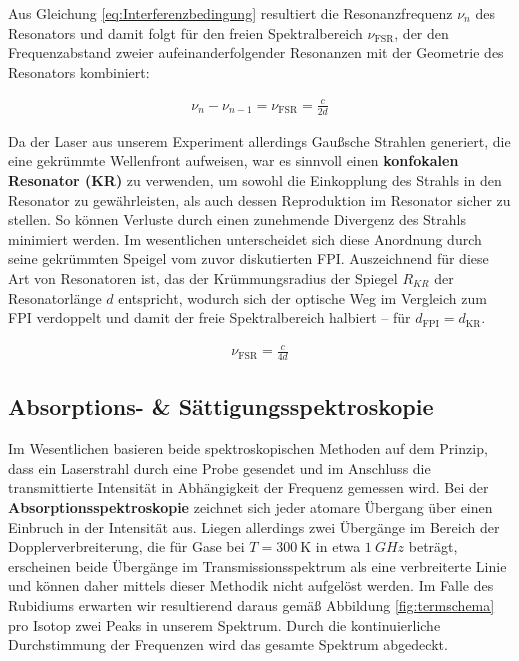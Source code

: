 \noindent Aus Gleichung \ref{eq:Interferenzbedingung} resultiert die Resonanzfrequenz $\nu_{n}$ des Resonators und damit folgt für den freien Spektralbereich $\nu_{\text{FSR}}$, der den Frequenzabstand zweier aufeinanderfolgender Resonanzen mit der Geometrie des Resonators kombiniert: 

\begin{align}
    \nu_{n}-\nu_{n-1}=\nu_{\text{FSR}}=\frac{c}{2d}
\end{align}


\noindent Da der Laser aus unserem Experiment allerdings Gaußsche Strahlen generiert, die eine gekrümmte Wellenfront aufweisen, war es sinnvoll einen \textbf{konfokalen Resonator (KR)} zu verwenden, um sowohl die Einkopplung des Strahls in den Resonator zu gewährleisten, als auch dessen Reproduktion im Resonator sicher zu stellen. So können Verluste durch einen zunehmende Divergenz des Strahls minimiert werden. Im wesentlichen unterscheidet sich diese Anordnung durch seine gekrümmten Speigel vom zuvor diskutierten FPI. Auszeichnend für diese Art von Resonatoren ist, das der Krümmungsradius der Spiegel $R_{KR}$ der Resonatorlänge $d$ entspricht, wodurch sich der optische Weg im Vergleich zum FPI verdoppelt und damit der freie Spektralbereich halbiert -- für $d_{\text{FPI}}=d_{\text{KR}}$.

\begin{align}
    \nu_{\text{FSR}}=\frac{c}{4d} \label{eq:freier Spektral Bereich}
\end{align}

\subsection{Absorptions- \& Sättigungsspektroskopie}

\noindent Im Wesentlichen basieren beide spektroskopischen Methoden auf dem Prinzip, dass ein Laserstrahl durch eine Probe gesendet und im Anschluss die transmittierte Intensität in Abhängigkeit der Frequenz gemessen wird. Bei der \textbf{Absorptionsspektroskopie} zeichnet sich jeder atomare Übergang über einen Einbruch in der Intensität aus. Liegen allerdings zwei Übergänge im Bereich der Dopplerverbreiterung, die für Gase bei $T=\SI{300}{\kelvin}$ in etwa $\SI{1}{GHz}$ beträgt, erscheinen beide Übergänge im Transmissionsspektrum als eine verbreiterte Linie und können daher mittels dieser Methodik nicht aufgelöst werden. Im Falle des Rubidiums erwarten wir resultierend daraus gemäß Abbildung \ref{fig:termschema} pro Isotop zwei Peaks in unserem Spektrum. Durch die kontinuierliche Durchstimmung der Frequenzen wird das gesamte Spektrum abgedeckt. 

